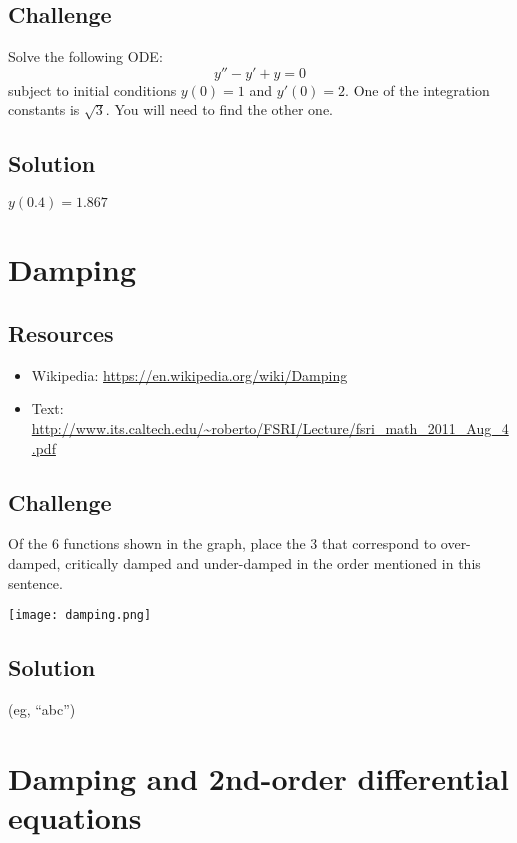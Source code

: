 \subsection*{Challenge}
Solve the following ODE:
\begin{equation}
    y'' - y' + y = 0
\end{equation}
subject to initial conditions $y(0)=1$ and $y'(0)=2$. One of the integration constants is $\sqrt{3}$. You will need to find the other one.

\subsection*{Solution}
$y(0.4)=1.867$




\newpage
\section{Damping}
\label{sec:damping}

\subsection*{Resources}
\begin{itemize}
    \item Wikipedia: \url{https://en.wikipedia.org/wiki/Damping}
    \item Text: \url{http://www.its.caltech.edu/~roberto/FSRI/Lecture/fsri_math_2011_Aug_4.pdf}
\end{itemize}

\subsection*{Challenge}
Of the 6 functions shown in the graph, place the 3 that correspond to over-damped, critically damped and under-damped in the order mentioned in this sentence.

\texttt{[image: damping.png]}
\subsection*{Solution}
(eg, ``abc'')





\newpage
\section{Damping and 2nd-order differential equations} %

